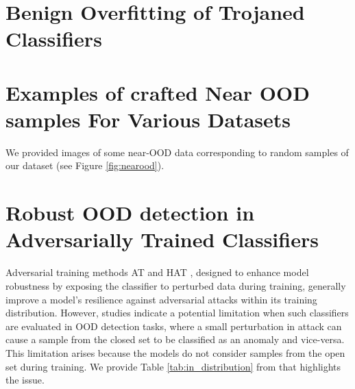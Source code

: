 \appendix
\setcounter{secnumdepth}{1}


\section{Benign Overfitting of Trojaned Classifiers}


\clearpage

\newpage

\section{Examples of crafted Near OOD samples For Various Datasets}
\label{sec:nearood}
We provided images of some near-OOD data corresponding to random samples of our dataset (see Figure \ref{fig:nearood}).



\newpage
\section{Robust OOD detection in Adversarially Trained Classifiers}
\label{app:aziz}
Adversarial training methods AT \cite{AT} and HAT \cite{HAT}, designed to enhance model robustness by exposing the classifier to perturbed data during training, generally improve a model's resilience against adversarial attacks within its training distribution. However, studies \cite{azizmalayeri2022your, chen2020robust} indicate a potential limitation when such classifiers are evaluated in OOD detection tasks, where a small perturbation in attack can cause a sample from the closed set to be classified as an anomaly and vice-versa.  This limitation arises because the models do not consider samples from the open set during training. We provide Table \ref{tab:in_distribution} from \cite{azizmalayeri2022your} that highlights the issue.
%



